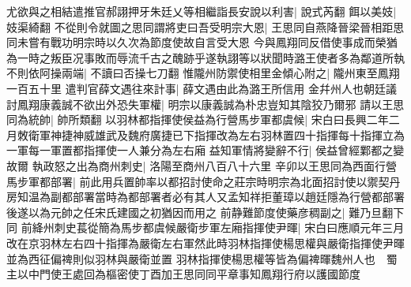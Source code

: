 尤欲與之相結遣推官郝詡押牙朱廷乂等相繼詣長安說以利害|{
	說式芮翻}
餌以美妓|{
	妓渠綺翻}
不從則令就圖之思同謂將吏曰吾受明宗大恩|{
	王思同自燕降晉梁晉相距思同未嘗有戰功明宗時以久次為節度使故自言受大恩}
今與鳳翔同反借使事成而榮猶為一時之叛臣况事敗而辱流千古之醜跡乎遂執詡等以狀聞時潞王使者多為鄰道所執不則依阿操兩端|{
	不讀曰否操七刀翻}
惟隴州防禦使相里金傾心附之|{
	隴州東至鳳翔一百五十里}
遣判官薛文遇往來計事|{
	薛文遇由此為潞王所信用}
金幷州人也朝廷議討鳳翔康義誠不欲出外恐失軍權|{
	明宗以康義誠為朴忠豈知其陰狡乃爾邪}
請以王思同為統帥|{
	帥所類翻}
以羽林都指揮使侯益為行營馬步軍都虞候|{
	宋白曰長興二年二月敇衛軍神捷神威雄武及魏府廣捷已下指揮改為左右羽林置四十指揮每十指揮立為一軍每一軍置都指揮使一人兼分為左右廂}
益知軍情將變辭不行|{
	侯益曾經鄴都之變故爾}
執政怒之出為商州刺史|{
	洛陽至商州八百八十六里}
辛卯以王思同為西面行營馬步軍都部署|{
	前此用兵置帥率以都招討使命之莊宗時明宗為北面招討使以禦契丹房知温為副都部署當時為都部署者必有其人又孟知祥拒董璋以趙廷隱為行營都部署後遂以為元帥之任宋氏建國之初猶因而用之}
前静難節度使藥彦稠副之|{
	難乃旦翻下同}
前絳州刺史萇從簡為馬步都虞候嚴衛步軍左廂指揮使尹暉|{
	宋白曰應順元年三月改在京羽林左右四十指揮為嚴衛左右軍然此時羽林指揮使楊思權與嚴衛指揮使尹暉並為西征偏禆則似羽林與嚴衛並置}
羽林指揮使楊思權等皆為偏禆暉魏州人也　蜀主以中門使王處回為樞密使丁酉加王思同同平章事知鳳翔行府以護國節度

